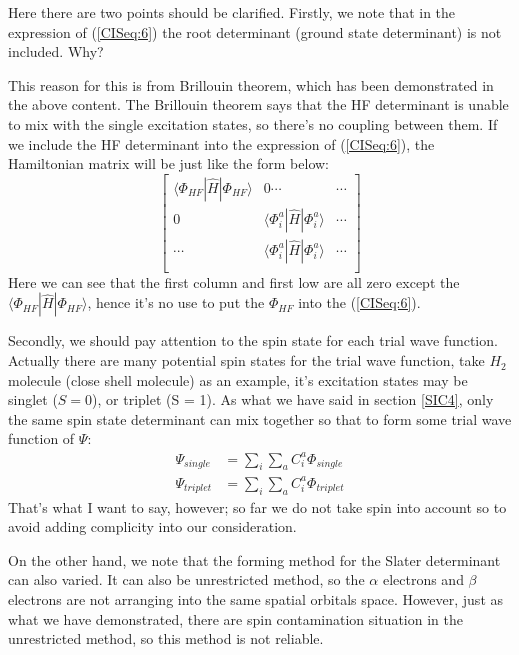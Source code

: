 Here there are two points should be clarified. Firstly, we note that
in the expression of (\ref{CISeq:6}) the root determinant (ground
state determinant) is not included. Why?

This reason for this is from Brillouin theorem, which has been
demonstrated in the above content. The Brillouin theorem says that the
HF determinant is unable to mix with the single excitation states, so
there's no coupling between them. If we include the HF determinant
into the expression of (\ref{CISeq:6}), the Hamiltonian matrix will be
just like the form below:
\begin{equation}
  \label{CISeq:7}
  \begin{bmatrix}
    \langle\Phi_{HF}|\hat{H}|\Phi_{HF}\rangle & 0  \cdots & \cdots \\
    0 & \langle \Phi_{i}^{a}|\hat{H}|\Phi_{i}^{a} \rangle & \cdots \\
    \cdots & \langle \Phi_{i}^{a}|\hat{H}|\Phi_{i}^{a} \rangle & \cdots \\
  \end{bmatrix}
\end{equation}
Here we can see that the first column and first low are all zero
except the $\langle\Phi_{HF}|\hat{H}|\Phi_{HF}\rangle$, hence it's no
use to put the $\Phi_{HF}$ into the (\ref{CISeq:6}). 

Secondly, we should pay attention to the spin state for each trial
wave function. Actually there are many potential spin states for the
trial wave function, take $H_{2}$ molecule (close shell molecule) as
an example, it's excitation states may be singlet ($S = 0$), or
triplet (S = 1). As what we have said in section \ref{SIC4}, only the
same spin state determinant can mix together so that to form some
trial wave function of $\Psi$:
\begin{align}
  \label{CISeq:8}
\Psi_{single} &= \sum_{i}\sum_{a}C_{i}^{a}\Phi_{single} \nonumber \\
\Psi_{triplet} &= \sum_{i}\sum_{a}C_{i}^{a}\Phi_{triplet}  
\end{align}
That's what I want to say, however; so far we do not take spin into
account so to avoid adding complicity into our consideration.

On the other hand, we note that the forming method for the Slater
determinant can also varied. It can also be unrestricted method, so
the $\alpha$ electrons and $\beta$ electrons are not arranging into
the same spatial orbitals space. However, just as what we have
demonstrated, there are spin contamination situation in the
unrestricted method, so this method is not reliable.

